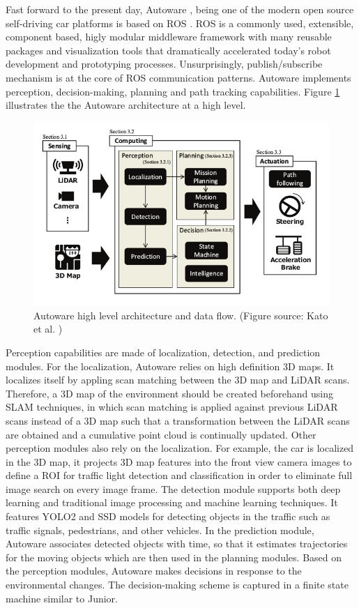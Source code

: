 Fast forward to the present day, Autoware \cite{Kato2018AutowareOB}, being one
of the modern open source self-driving car platforms is based on ROS
\cite{Quigley2009ROSAO}. ROS is a commonly used, extensible, component based,
higly modular middleware framework with many reusable packages and
visualization tools that dramatically accelerated today's robot development and
prototyping processes. Unsurprisingly, publish/subscribe mechanism is at the
core of ROS communication patterns. Autoware implements perception,
decision-making, planning and path tracking capabilities. Figure
\ref{figure:autoware} illustrates the the Autoware architecture at a high
level.

\begin{figure}[h]
  \centering
  \includegraphics[width=.8\textwidth]{figures/autoware.png}
  \caption[Autoware high level architecture]{Autoware high level architecture
    and data flow. (Figure source: Kato et al. \cite{Kato2018AutowareOB})}
  \label{figure:autoware}
\end{figure}

Perception capabilities are made of localization, detection, and prediction
modules. For the localization, Autoware relies on high definition 3D maps. It
localizes itself by appling scan matching between the 3D map and LiDAR scans.
Therefore, a 3D map of the environment should be created beforehand using SLAM
techniques, in which scan matching is applied against previous LiDAR scans
instead of a 3D map such that a transformation between the LiDAR scans are
obtained and a cumulative point cloud is continually updated. Other perception
modules also rely on the localization. For example, the car is localized in
the 3D map, it projects 3D map features into the front view camera images to
define a ROI for traffic light detection and classification in order to
eliminate full image search on every image frame. The detection module supports
both deep learning and traditional image processing and machine learning
techniques. It features YOLO2 \cite{Redmon2016YOLO9000BF} and SSD
\cite{Liu2016SSDSS} models for detecting objects in the traffic such as traffic
signals, pedestrians, and other vehicles. In the prediction module, Autoware
associates detected objects with time, so that it estimates trajectories for
the moving objects which are then used in the planning modules. Based on the
perception modules, Autoware makes decisions in response to the environmental
changes. The decision-making scheme is captured in a finite state machine
similar to Junior.


